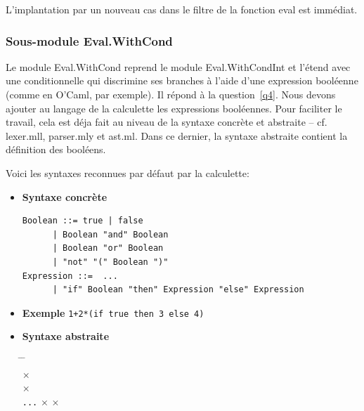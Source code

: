 \documentclass[a4paper,11pt]{article}
\newcommand{\ibullet}{\item[$\bullet$]}
\newcommand{\inferlabel}[1]{\inferrule*[right=\textsc{#1}]}
\begin{document}

L'implantation par un nouveau cas dans le filtre de la fonction
\textsf{eval} est immédiat.


\subsubsection{Sous-module \textsf{Eval.WithCond}}
\label{Eval.WithCond}

Le module \textsf{Eval.WithCond} reprend le module
\textsf{Eval.WithCondInt} et l'étend avec une conditionnelle qui
discrimine ses branches à l'aide d'une expression booléenne (comme en
O'Caml, par exemple). Il répond à la question~\ref{q4}. Nous devons
ajouter au langage de la calculette les expressions booléennes.  Pour
faciliter le travail, cela est déja fait au niveau de la syntaxe
concrète et abstraite -- cf. \textsf{lexer.mll}, \textsf{parser.mly}
et \textsf{ast.ml}. Dans ce dernier, la syntaxe abstraite contient la
définition des booléens.

Voici les syntaxes reconnues par défaut par la calculette:
  \begin{itemize}

    \ibullet \textbf{Syntaxe concrète}
  {\small
   \begin{verbatim}
Boolean ::= true | false
      | Boolean "and" Boolean
      | Boolean "or" Boolean
      | "not" "(" Boolean ")"
Expression ::=  ...
      | "if" Boolean "then" Expression "else" Expression
   \end{verbatim}
}

  \vspace*{-6pt}

  \ibullet \textbf{Exemple} \qquad \texttt{1+2*(if true then 3
  else 4)}

  \ibullet \textbf{Syntaxe abstraite}

  \begin{tabbing}
      \= \equal{} \=  \vbar{}
     \vbar{}   \\
    \> \vbar \>    \(\times\)
    \\
    \> \vbar \>   
    \(\times\) \\
      \equal{} \texttt{...} \vbar{} 
      \(\times\)  \(\times\)
  \end{tabbing}

  \end{itemize}
\end{document}
